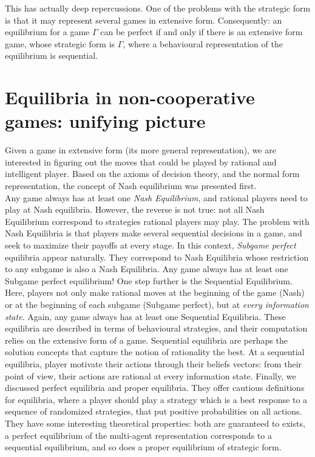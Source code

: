 This has actually deep repercussions. One of the problems with the strategic form is that it may represent several games in extensive form.
Consequently: an equilibrium for a game $\Gamma$ can be perfect if and only if there is an extensive form game, whose strategic form is $\Gamma$, where a behavioural representation of the equilibrium is sequential.


\section{Equilibria in non-cooperative games: unifying picture}

Given a game in extensive form (its more general representation), we are interested in figuring out the moves that could be played by rational and intelligent player. Based on the axioms of decision theory, and the normal form representation, the concept of Nash equilibrium was presented first.\\
Any game always has at least one \emph{Nash Equilibrium}, and rational players need to play at Nash equilibria. However, the reverse is not true: not all Nash Equilibrium correspond to strategies rational players may play.
The problem with Nash Equilibria is that players make several sequential decisions  in a game, and seek to maximize their payoffs at every stage. In this context, \emph{Subgame perfect} equilibria appear naturally. They correspond to Nash Equilibria whose restriction to any subgame is also a Nash Equilibria. Any game always has at least one Subgame perfect equilibrium!
One step further is the Sequential Equilibrium. Here, players not only make rational moves at the beginning of the game (Nash) or at the beginning of each subgame (Subgame perfect), but at \emph{every information state}. Again, any game always has at least one Sequential Equilibria. These equilibria are described in terms of behavioural strategies, and their computation relies on the extensive form of a game. Sequential equilibria are perhaps the solution concepts that capture the notion of rationality the best. At a sequential equilibria, player motivate their actions through their beliefs vectors: from their point of view, their actions are rational at every information state.
Finally, we discussed perfect equilibria and proper equilibria.
They offer cautious definitions for equilibria, where a player should play a strategy which is a best response to a sequence of randomized strategies, that put positive probabilities on all actions. They have some interesting theoretical properties: both are guaranteed to exists, a perfect equilibrium of the multi-agent representation corresponds to a sequential equilibrium, and so does a proper equilibrium of strategic form.

